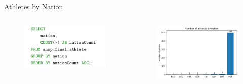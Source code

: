 \documentclass[aspectratio=169, xcolor=dvipsnames]{beamer}
\begin{document}
\begin{frame}{Athletes by Nation}
\begin{columns}[c]
\begin{column}{.4\textwidth}
\begin{figure}
    \centering
    \includegraphics[width=\textwidth]{img/sql/nation.png}
\end{figure}
\end{column}

\begin{column}{.6\textwidth}
\begin{figure}
    \centering
    \includegraphics[width=\textwidth]{img/athletesbynation.png}
\end{figure}
\end{column}
\end{columns}
\end{frame}
\end{document}
